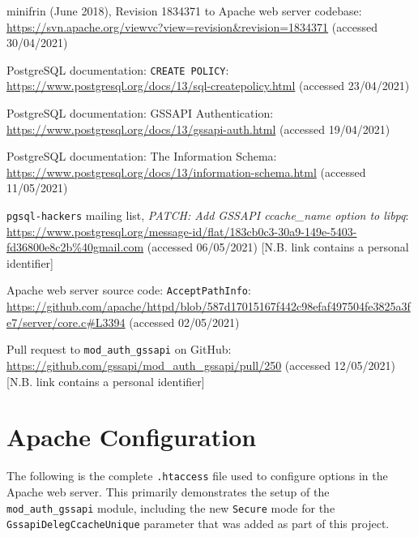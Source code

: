 \documentclass[12pt]{report}
\begin{document}
\begin{thebibliography}{99}
 minifrin (June 2018), Revision 1834371 to Apache web server codebase: \url{https://svn.apache.org/viewvc?view=revision&revision=1834371} (accessed 30/04/2021)

 PostgreSQL documentation: \texttt{CREATE POLICY}: \url{https://www.postgresql.org/docs/13/sql-createpolicy.html} (accessed 23/04/2021)

 PostgreSQL documentation: GSSAPI Authentication: \url{https://www.postgresql.org/docs/13/gssapi-auth.html} (accessed 19/04/2021)

 PostgreSQL documentation: The Information Schema: \url{https://www.postgresql.org/docs/13/information-schema.html} (accessed 11/05/2021)

 \texttt{pgsql-hackers} mailing list, \textit{PATCH: Add GSSAPI ccache\_name option to libpq}: \url{https://www.postgresql.org/message-id/flat/183cb0c3-30a9-149e-5403-fd36800e8c2b%40gmail.com} (accessed 06/05/2021) [N.B. link contains a personal identifier]

 Apache web server source code: \texttt{AcceptPathInfo}: \url{https://github.com/apache/httpd/blob/587d17015167f442c98efaf497504fe3825a3fe7/server/core.c#L3394} (accessed 02/05/2021)

 Pull request to \verb+mod_auth_gssapi+ on GitHub: \url{https://github.com/gssapi/mod_auth_gssapi/pull/250} (accessed 12/05/2021) [N.B. link contains a personal identifier]


\end{thebibliography}

\appendix
\chapter{Apache Configuration}
\label{sec:appendix1}
The following is the complete \verb+.htaccess+ file used to configure options in the Apache web server. This primarily demonstrates the setup of the \verb+mod_auth_gssapi+ module, including the new \texttt{Secure} mode for the \texttt{GssapiDelegCcacheUnique} parameter that was added as part of this project.
\end{document}
